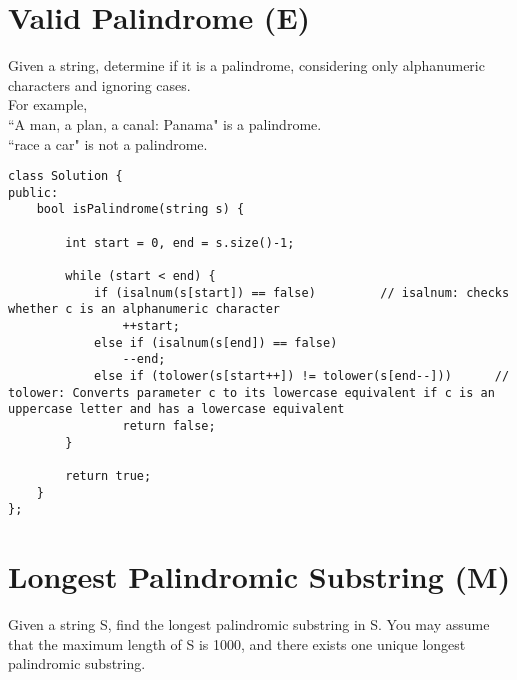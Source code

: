 \section{Valid Palindrome (E)}
Given a string, determine if it is a palindrome, considering only alphanumeric characters and ignoring cases. \\

For example,\\
``A man, a plan, a canal: Panama" is a palindrome.\\
``race a car" is not a palindrome. \\

\begin{lstlisting}
class Solution {
public:
    bool isPalindrome(string s) {
        
        int start = 0, end = s.size()-1;
        
        while (start < end) {
            if (isalnum(s[start]) == false)         // isalnum: checks whether c is an alphanumeric character
                ++start;
            else if (isalnum(s[end]) == false)
                --end;        
            else if (tolower(s[start++]) != tolower(s[end--]))      // tolower: Converts parameter c to its lowercase equivalent if c is an uppercase letter and has a lowercase equivalent
                return false;
        }
        
        return true;
    }
};
\end{lstlisting}


\section{Longest Palindromic Substring (M)}
Given a string S, find the longest palindromic substring in S. You may assume that the maximum length of S is 1000, and there exists one unique longest palindromic substring.\\

